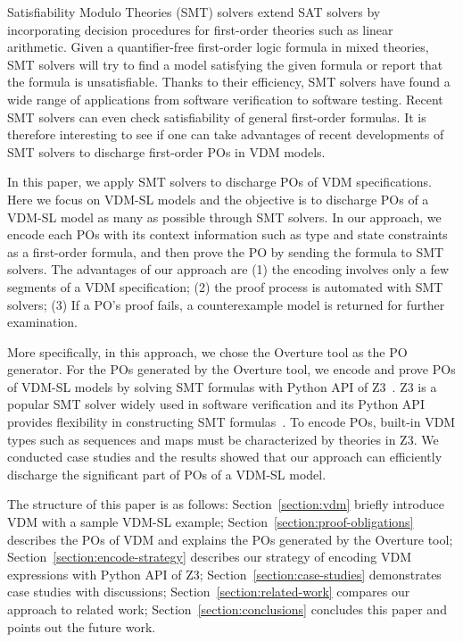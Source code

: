 Satisfiability Modulo Theories (SMT) solvers extend SAT solvers by incorporating decision procedures for first-order theories such as linear arithmetic. Given a quantifier-free first-order logic formula in mixed theories, SMT solvers will try to find a model satisfying the given formula or report that the formula is unsatisfiable. Thanks to their efficiency, SMT solvers have found a wide range of applications from software verification to software testing. Recent SMT solvers can even check satisfiability of general first-order formulas. It is therefore interesting to see if one can take advantages of recent developments of SMT solvers to discharge first-order POs in VDM models. 


In this paper, we apply SMT solvers to discharge POs of VDM specifications. Here we focus on VDM-SL models and the objective is to discharge POs of a VDM-SL model as many as possible through SMT solvers. In our approach, we encode each POs with its context information such as type and state constraints as a first-order formula, and then prove the PO by sending the formula to SMT solvers. The advantages of our approach are (1) the encoding involves only a few segments of a VDM specification; (2) the proof process is automated with SMT solvers; (3) If a PO's proof fails, a counterexample model is returned for further examination. 

More specifically, in this approach, we chose the Overture tool as the PO generator. For the POs generated by the Overture tool, we encode and prove POs of VDM-SL models by solving SMT formulas with Python API of Z3~\cite{MB:08:ZSS}. Z3 is a popular SMT solver widely used in software verification and its Python API provides flexibility in constructing SMT formulas~\cite{BarFT-SMTLIB}. To encode POs, built-in VDM types such as sequences and maps must be characterized by theories in Z3. We conducted case studies and the results showed that our approach can efficiently discharge the significant part of POs of a VDM-SL model.

The structure of this paper is as follows: Section~\ref{section:vdm} briefly introduce VDM with a sample VDM-SL example; Section~\ref{section:proof-obligations} describes the POs of VDM and explains the POs generated by the Overture tool; Section~\ref{section:encode-strategy} describes our strategy of encoding VDM expressions with Python API of Z3; Section~\ref{section:case-studies} demonstrates case studies with discussions; Section~\ref{section:related-work} compares our approach to related work; Section~\ref{section:conclusions} concludes this paper and points out the future work.

